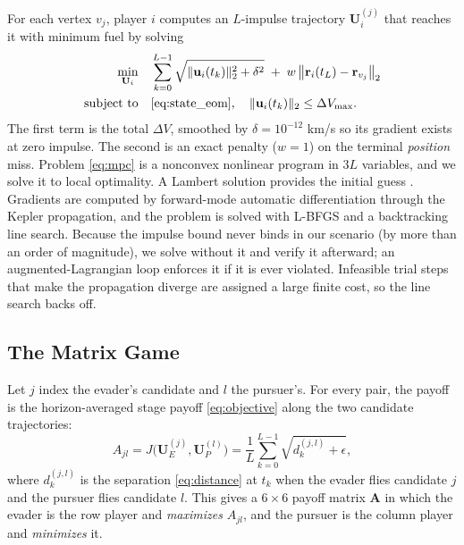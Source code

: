 For each vertex $v_j$, player $i$ computes an $L$-impulse trajectory $\mathbf{U}_i^{(j)}$ that reaches it with minimum fuel by solving
%
\begin{equation}
    \begin{aligned}
        \min_{\mathbf{U}_i} \quad & \sum_{k=0}^{L-1} \sqrt{\|\mathbf{u}_i(t_k)\|_2^2 + \delta^2} \; + \; w\,\big\|\mathbf{r}_i(t_L) - \mathbf{r}_{v_j}\big\|_2 \\
        \text{subject to} \quad & \eqref{eq:state_eom}, \quad \|\mathbf{u}_i(t_k)\|_2 \leq \Delta V_{\max} .
    \end{aligned}
    \label{eq:mpc}
\end{equation}
%
The first term is the total $\Delta V$, smoothed by $\delta = 10^{-12}$ km/s so its gradient exists at zero impulse. The second is an exact penalty ($w = 1$) on the terminal \emph{position} miss. Problem \eqref{eq:mpc} is a nonconvex nonlinear program in $3L$ variables, and we solve it to local optimality. A Lambert solution provides the initial guess \cite{vallado2001fundamentals}. Gradients are computed by forward-mode automatic differentiation through the Kepler propagation, and the problem is solved with L-BFGS and a backtracking line search. Because the impulse bound never binds in our scenario (by more than an order of magnitude), we solve without it and verify it afterward; an augmented-Lagrangian loop enforces it if it is ever violated. Infeasible trial steps that make the propagation diverge are assigned a large finite cost, so the line search backs off.


\subsection{The Matrix Game}

Let $j$ index the evader's candidate and $l$ the pursuer's. For every pair, the payoff is the horizon-averaged stage payoff \eqref{eq:objective} along the two candidate trajectories:
%
\begin{equation}
    A_{jl} = J\big(\mathbf{U}_E^{(j)}, \mathbf{U}_P^{(l)}\big) = \frac{1}{L} \sum_{k=0}^{L-1} \sqrt{d_k^{(j,l)} + \epsilon},
    \label{eq:ave_stage_cost}
\end{equation}
%
where $d_k^{(j,l)}$ is the separation \eqref{eq:distance} at $t_k$ when the evader flies candidate $j$ and the pursuer flies candidate $l$. This gives a $6 \times 6$ payoff matrix $\mathbf{A}$ in which the evader is the row player and \emph{maximizes} $A_{jl}$, and the pursuer is the column player and \emph{minimizes} it.

